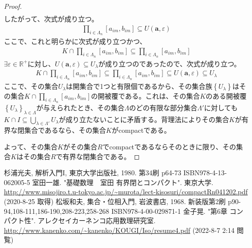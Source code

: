 \documentclass[dvipdfmx]{jsarticle}
\begin{document}
\begin{proof}
\begin{align*}
\end{align*}
したがって、次式が成り立つ。
\begin{align*}
\prod_{i \in \varLambda_{n}} \left[ a_{im},b_{im} \right] \subseteq U\left( \mathbf{a},\varepsilon \right)
\end{align*}
ここで、これと明らかに次式が成り立つかつ、
\begin{align*}
K \cap \prod_{i \in \varLambda_{n}} \left[ a_{im},b_{im} \right] \subseteq \prod_{i \in \varLambda_{n}} \left[ a_{im},b_{im} \right]
\end{align*}
$\exists\varepsilon \in \mathbb{R}^{+}$に対し、$U\left( \mathbf{a},\varepsilon \right) \subseteq U_{\lambda}$が成り立つのであったので、次式が成り立つ。
\begin{align*}
K \cap \prod_{i \in \varLambda_{n}} \left[ a_{im},b_{im} \right] \subseteq \prod_{i \in \varLambda_{n}} \left[ a_{im},b_{im} \right] \subseteq U\left( \mathbf{a},\varepsilon \right) \subseteq U_{\lambda}
\end{align*}
ここで、その集合$U_{\lambda}$は開集合で1つと有限個であるから、その集合族$\left\{ U_{\lambda} \right\}$はその集合$K \cap \prod_{i \in \varLambda_{n}} \left[ a_{im},b_{im} \right]$の開被覆である。これは、その集合$K$のある開被覆$\left\{ U_{\lambda} \right\}_{\lambda \in \varLambda}$が与えられたとき、その集合$\varLambda$のどの有限な部分集合$\varLambda'$に対しても$K \cap I \subseteq \bigcup_{\lambda \in \varLambda'} U_{\lambda}$が成り立たないことに矛盾する。背理法によりその集合$K$が有界な閉集合であるなら、その集合$K$がcompactである。\par
よって、その集合$K$がその集合$R$でcompactであるならそのときに限り、その集合$K$はその集合$R$で有界な閉集合である。
\end{proof}
\begin{thebibliography}{50}
  杉浦光夫, 解析入門I, 東京大学出版社, 1980. 第34刷 p64-73 ISBN978-4-13-062005-5
  室田一雄. "基礎数理　室田 有界閉とコンパクト". 東京大学. \url{http://www.misojiro.t.u-tokyo.ac.jp/~murota/lect-kisosuri/compactRn041202.pdf} (2020-8-25 取得)
  松坂和夫, 集合・位相入門, 岩波書店, 1968. 新装版第2刷 p90-94,108-111,186-190,208-223,258-268 ISBN978-4-00-029871-1
  金子晃. "第6章 コンパクト性". アレクセイカーネンコ応用数理研究室. \url{http://www.kanenko.com/~kanenko/KOUGI/Iso/resume4.pdf} (2022-8-7 2:14 閲覧)
\end{thebibliography}
\end{document}
